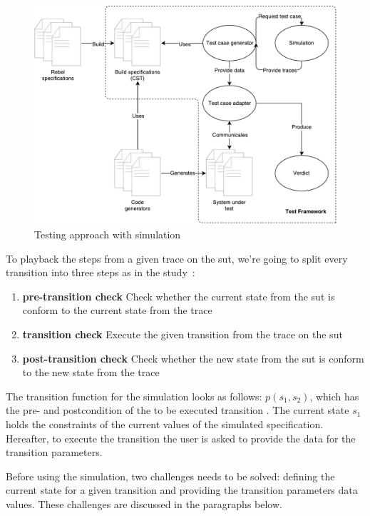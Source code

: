 \begin{figure}[h!]
  \centering
  \includegraphics[width=\linewidth{}]{figures/simulation-diagram.pdf}
  \caption{Testing approach with simulation}\label{fig:simulation-testing}
\end{figure}
\FloatBarrier

To playback the steps from a given trace on the \gls{sut}, we're going to split every
transition into three steps as in the
study~\cite[p.~6]{stoel_storm_vinju_bosman_2016}:
\begin{enumerate}
\item \textbf{pre-transition check} Check whether the current state from the \gls{sut}
is conform to the current state from the trace
\item \textbf{transition check} Execute the given transition from the trace on
the \gls{sut}
\item \textbf{post-transition check} Check whether the new state from the \gls{sut} is
conform to the new state from the trace
\end{enumerate}

The transition function for the simulation looks as follows: $p(s_{1}, s_{2})$,
which has the pre- and postcondition of the to be executed transition
\cite[p.6]{stoel_storm_vinju_bosman_2016}. The current state $s_{1}$ holds the
constraints of the current values of the simulated specification. Hereafter, to
execute the transition the user is asked to provide the data for the transition
parameters.

Before using the simulation, two challenges needs to be solved: defining the
current state for a given transition and providing the transition parameters
data values. These challenges are discussed in the paragraphs below.

